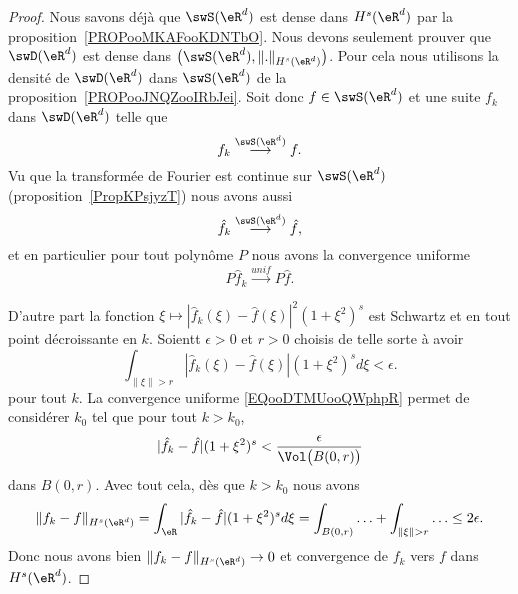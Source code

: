 \begin{proof}
	Nous savons déjà que \( \swS(\eR^d)\) est dense dans \( H^s(\eR^d)\) par la proposition~\ref{PROPooMKAFooKDNTbO}. Nous devons seulement prouver que \( \swD(\eR^d)\) est dense dans \( \big( \swS(\eR^d),\| . \|_{H^s(\eR^d)} \big)\). Pour cela nous utilisons la densité de \( \swD(\eR^d)\) dans \( \swS(\eR^d)\) de la proposition~\ref{PROPooJNQZooIRbJei}. Soit donc \( f\in\swS(\eR^d)\) et une suite \( f_k\) dans \( \swD(\eR^d)\) telle que
	\begin{equation}
		f_k\stackrel{\swS(\eR^d)}{\longrightarrow}f.
	\end{equation}
	Vu que la transformée de Fourier est continue sur \( \swS(\eR^d)\) (proposition~\ref{PropKPsjyzT}) nous avons aussi
	\begin{equation}
		\hat f_k\stackrel{\swS(\eR^d)}{\longrightarrow}\hat f,
	\end{equation}
	et en particulier pour tout polynôme \( P\) nous avons la convergence uniforme
	\begin{equation}        \label{EQooDTMUooQWphpR}
		P\hat f_k\stackrel{unif}{\longrightarrow}P\hat f.
	\end{equation}

	D'autre part la fonction \( \xi\mapsto | \hat f_k(\xi)-\hat f(\xi) |^2(1+\xi^2)^s\) est Schwartz et en tout point décroissante en \( k\). Soientt \( \epsilon>0\) et \( r>0\) choisis de telle sorte à avoir
	\begin{equation}
		\int_{\| \xi \|>r}| \hat f_{k}(\xi)-\hat f(\xi) |(1+\xi^2)^sd\xi<\epsilon.
	\end{equation}
	pour tout \( k\). La convergence uniforme \eqref{EQooDTMUooQWphpR} permet de considérer \( k_0\) tel que  pour tout \( k>k_0\),
	\begin{equation}
		| \hat f_k-\hat f |(1+\xi^2)^s< \frac{ \epsilon }{ \Vol\big( B(0,r) \big) }
	\end{equation}
	dans \( B(0,r)\). Avec tout cela, dès que \( k>k_0\) nous avons
	\begin{equation}
		\| f_k-f \|_{H^s(\eR^d)}=\int_{\eR}| \hat f_k-\hat f |(1+\xi^2)^sd\xi=\int_{B(0,r)}\ldots +\int_{\| \xi \|>r}\ldots\leq 2\epsilon.
	\end{equation}
	Donc nous avons bien \( \| f_k-f \|_{H^s(\eR^d)}\to 0\) et convergence de \( f_k\) vers \( f\) dans \( H^s(\eR^d)\).
\end{proof}

